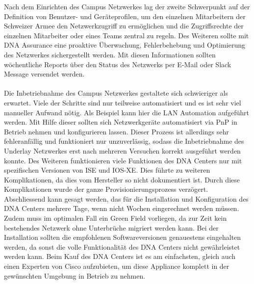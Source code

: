 Nach dem Einrichten des Campus Netzwerkes lag der zweite Schwerpunkt auf der Definition von Benutzer- und Geräteprofilen, um den einzelnen Mitarbeitern der Schweizer Armee den Netzwerkzugriff zu ermöglichen und die Zugriffsrechte der einzelnen Mitarbeiter oder eines Teams zentral zu regeln. Des Weiteren sollte mit DNA Assurance eine proaktive Überwachung, Fehlerbehebung und Optimierung des Netzwerkes sichergestellt werden. Mit diesen Informationen sollten wöchentliche Reports über den Status des Netzwerks per E-Mail oder Slack Message versendet werden.\\
\\
Die Inbetriebnahme des Campus Netzwerkes gestaltete sich schwieriger als erwartet. Viele der Schritte sind nur teilweise automatisiert und es ist sehr viel manueller Aufwand nötig. Als Beispiel kann hier die LAN Automation aufgeführt werden. Mit Hilfe dieser sollten sich Netzwerkgeräte automatisiert via PnP in Betrieb nehmen und konfigurieren lassen. Dieser Prozess ist allerdings sehr fehleranfällig und funktioniert nur unzuverlässig, sodass die Inbetriebnahme des Underlay Netzwerkes erst nach mehreren Versuchen korrekt ausgeführt werden konnte. 
Des Weiteren funktionieren viele Funktionen des DNA Centers nur mit spezifischen Versionen von ISE und IOS-XE. Dies führte zu weiteren Komplikationen, da dies vom Hersteller so nicht dokumentiert ist. 
Durch diese Komplikationen wurde der ganze Provisionierungsprozess verzögert. 
\\
Abschliessend kann gesagt werden, das für die Installation und Konfiguration des DNA Centers mehrere Tage, wenn nicht Wochen eingerechnet werden müssen. Zudem muss im optimalen Fall ein Green Field vorliegen, da zur Zeit kein bestehendes Netzwerk ohne Unterbrüche migriert werden kann. Bei der Installation sollten die empfohlenen Softwareversionen genauestens eingehalten werden, da sonst die volle Funktionalität des DNA Centers nicht gewährleistet werden kann. Beim Kauf des DNA Centers ist es am einfachsten, gleich auch einen Experten von Cisco aufzubieten, um diese Appliance komplett in der gewünschten Umgebung in Betrieb zu nehmen. 


